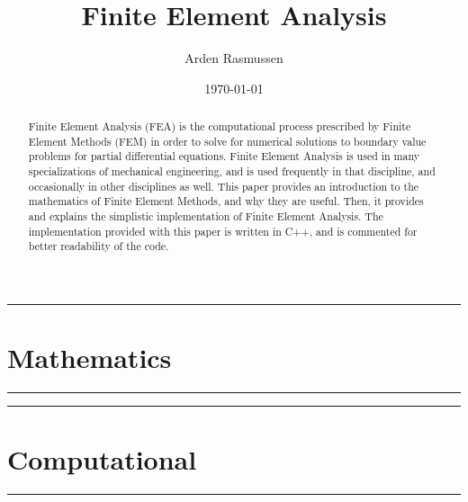 \documentclass[12pt]{armath}
\title{Finite Element Analysis}
\author{Arden Rasmussen}
\date{\today}
\numberwithin{equation}{section}
\theoremstyle{definition}
\newcommand{\hdiv}[3]{
  \vspace{#1}%
  \noindent\rule{\textwidth}{#2}%
  \vspace{#3}%
}
\begin{document}
\maketitle

\begin{abstract}
  Finite Element Analysis (FEA) is the computational process prescribed by
  Finite Element Methods (FEM) in order to solve for numerical solutions to
  boundary value problems for partial differential equations. Finite Element
  Analysis is used in many specializations of mechanical engineering, and is
  used frequently in that discipline, and occasionally in other disciplines as
  well. This paper provides an introduction to the mathematics of Finite
  Element Methods, and why they are useful. Then, it provides and explains the
  simplistic implementation of Finite Element Analysis. The implementation
  provided with this paper is written in C++, and is commented for better
  readability of the code.
\end{abstract}



\newpage
\hdiv{10pt}{0.5pt}{1pt}
\part{Mathematics}%
\label{prt:mathematics}
\hdiv{1pt}{0.5pt}{10pt}











\newpage
\hdiv{10pt}{0.5pt}{1pt}
\part{Computational}%
\label{prt:computational}
\hdiv{1pt}{0.5pt}{10pt}

\newpage
\nocite{*}


\end{document}
